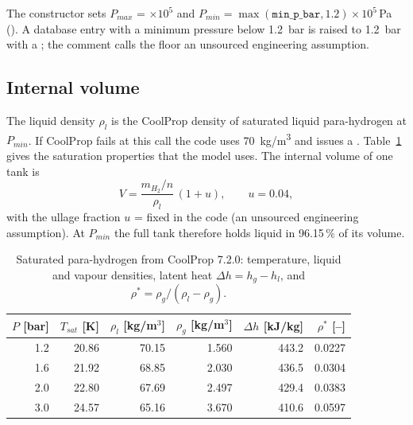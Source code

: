 \documentclass[a4paper,11pt]{article}
\begin{document}
The constructor sets $P_{max}$ = $\times10^5$ and $P_{min} =
\max(\texttt{min\_p\_bar}, 1.2)\times10^5$\,Pa (). A database entry
with a minimum pressure below \SI{1.2}{bar} is raised to \SI{1.2}{bar} with a
; the comment calls the floor an unsourced engineering assumption.

\subsection{Internal volume}\label{sec:volume}
The liquid density $\rho_l$ is the CoolProp density of saturated liquid para-hydrogen at
$P_{min}$. If CoolProp fails at this call the code uses \SI{70}{kg/m^3} and issues a
. Table~\ref{tab:props} gives the saturation properties that the model uses.
The internal volume of one tank is
\begin{equation}
  V = \frac{m_{H_2}/n}{\rho_l}\,(1 + u), \qquad u = 0.04,
  \label{eq:volume}
\end{equation}
with the ullage fraction $u$ =  fixed in the code (an unsourced
engineering assumption). At $P_{min}$ the full tank
therefore holds liquid in 96.15\,\% of its volume.

\begin{table}[htbp]
\centering\small
\caption{Saturated para-hydrogen from CoolProp 7.2.0: temperature, liquid and vapour densities,
latent heat $\Delta h = h_g - h_l$, and $\rho^* = \rho_g/(\rho_l - \rho_g)$.}\label{tab:props}
\begin{tabular}{@{}rrrrrr@{}}
\toprule
$P$ [bar] & $T_{sat}$ [K] & $\rho_l$ [kg/m$^3$] & $\rho_g$ [kg/m$^3$] & $\Delta h$ [kJ/kg] & $\rho^*$ [--] \\
\midrule
1.2 & 20.86 & 70.15 & 1.560 & 443.2 & 0.0227 \\
1.6 & 21.92 & 68.85 & 2.030 & 436.5 & 0.0304 \\
2.0 & 22.80 & 67.69 & 2.497 & 429.4 & 0.0383 \\
3.0 & 24.57 & 65.16 & 3.670 & 410.6 & 0.0597 \\
\bottomrule
\end{tabular}
\end{table}
\end{document}
